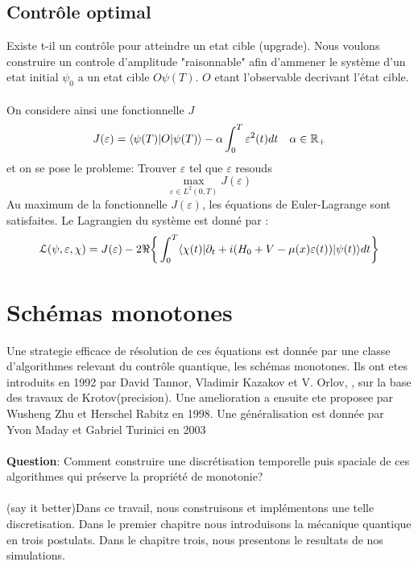 \subsection*{Contrôle optimal}
Existe t-il un contrôle pour atteindre un etat cible (upgrade).
Nous voulons construire un controle d'amplitude "raisonnable" afin d'ammener le système d'un etat initial $\psi_0$ a un etat cible $O\psi(T)$. $O$ etant l'observable decrivant l'état cible.\\\\
On considere ainsi une fonctionnelle $J$
\begin{equation}
J(\varepsilon) = \langle \psi(T)|O|\psi(T) \rangle - \alpha \int_{0}^{T}\varepsilon^2(t)dt \quad \alpha \in \mathbb R_+
\end{equation}
et on se pose le probleme: Trouver $\varepsilon$ tel que $\varepsilon$ resouds
$$ \max_{\varepsilon \in L^2(0,T)} J(\varepsilon)$$
Au maximum de la fonctionnelle $J(\varepsilon)$, les équations de Euler-Lagrange sont satisfaites. Le Lagrangien du système est donné par :
\begin{equation} \label{lagrangien}
\mathcal{L}(\psi,\varepsilon,\chi)= J(\varepsilon)\\
-2\Re \bigg\{ \int_{0}^{T}\langle \chi (t)|\partial_{t}+i(H_0+V-\mu(x)\varepsilon(t))|\psi(t) \rangle dt \bigg\}
\end{equation}
\section*{Schémas monotones}
Une strategie efficace de résolution de ces équations est donnée par une classe d’algorithmes relevant du contrôle quantique, les schémas monotones. Ils ont etes introduits en 1992 par David Tannor, Vladimir Kazakov et V. Orlov,  \cite{Tannor}, sur la base des travaux de Krotov(precision). Une amelioration a ensuite ete proposee par Wusheng Zhu et Herschel Rabitz \cite{Zhu} en 1998. Une généralisation est donnée par Yvon Maday et Gabriel Turinici en 2003 \cite{Maday}\\\\
\textbf{Question}: Comment construire une discrétisation temporelle puis spaciale de ces algorithmes qui préserve la propriété de monotonie?\\\\
(say it better)Dans ce travail, nous construisons et implémentons une telle discretisation.
Dans le premier chapitre nous introduisons la mécanique quantique en trois postulats.
Dans le chapitre trois, nous presentons le resultats de nos simulations.


